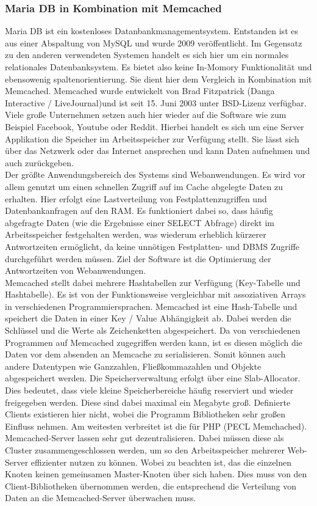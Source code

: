 \documentclass[a4paper, 12pt]{scrartcl}
\begin{document}
\subsubsection{Maria DB in Kombination mit Memcached}
Maria DB ist ein kostenloses Datanbankmanagementsystem. Entstanden ist es aus einer Abspaltung von MySQL und wurde 2009 veröffentlicht. Im Gegensatz zu den anderen verwendeten Systemen handelt es sich hier um ein normales relationales Datenbanksystem. Es bietet also keine In-Momory Funktionalität und ebensowenig spaltenorientierung. Sie dient hier dem Vergleich in Kombination mit Memcached.  
Memcached wurde entwickelt von Brad Fitzpatrick (Danga Interactive /  LiveJournal)und ist seit 15. Juni 2003 unter BSD-Lizenz verfügbar.
Viele große Unternehmen setzen auch hier wieder auf die Software wie zum Beispiel Facebook, Youtube oder Reddit. Hierbei handelt es sich um eine Server Applikation die Speicher im Arbeitsspeicher zur Verfügung stellt. Sie lässt sich über das Netzwerk oder das Internet ansprechen und kann Daten aufnehmen und auch zurückgeben. \\ Der größte Anwendungsbereich des Systems sind Webanwendungen. Es wird vor allem genutzt um einen schnellen Zugriff auf im Cache abgelegte Daten zu erhalten. Hier erfolgt eine Lastverteilung von Festplattenzugriffen und Datenbankanfragen auf den RAM. Es funktioniert dabei so, dass häufig abgefragte Daten (wie die Ergebnisse einer SELECT Abfrage) direkt im Arbeitsspeicher festgehalten werden, was wiederum erheblich kürzerer Antwortzeiten ermöglicht, da keine unnötigen Festplatten- und DBMS Zugriffe durchgeführt werden müssen. Ziel der Software ist die Optimierung der Antwortzeiten von Webanwendungen. \\ Memcached stellt dabei mehrere Hashtabellen zur Verfügung (Key-Tabelle und Hashtabelle). Es ist von der Funktionsweise vergleichbar mit assoziativen Arrays in verschiedenen Programmiersprachen. Memcached ist eine Hash-Tabelle und speichert die Daten in einer Key / Value Abhängigkeit ab. Dabei werden die Schlüssel und die Werte als Zeichenketten abgespeichert. Da von verschiedenen Programmen auf Memcached zugegriffen werden kann, ist es diesen möglich die Daten vor dem absenden an Memcache zu serialisieren. Somit können auch andere Datentypen wie Ganzzahlen, Fließkommazahlen und Objekte abgespeichert werden. Die Speicherverwaltung erfolgt über eine Slab-Allocator. Dies bedeutet, dass viele kleine Speicherbereiche häufig reserviert und wieder freigegeben werden. Diese sind dabei maximal ein Megabyte groß. Definierte Clients existieren hier nicht, wobei die Programm Bibliotheken sehr großen Einfluss nehmen. Am weitesten verbreitet ist die für PHP (PECL Memchached). \\Memcached-Server lassen sehr gut dezentralisieren. Dabei müssen diese  als Cluster zusammengeschlossen werden, um so den Arbeitsspeicher mehrerer Web-Server effizienter nutzen zu können. Wobei zu beachten ist, das die einzelnen Knoten keinen gemeinsamen Master-Knoten über sich haben. Dies muss von den Client-Bibliotheken übernommen werden, die entsprechend die Verteilung von Daten an die Memcached-Server überwachen muss.
\end{document}
